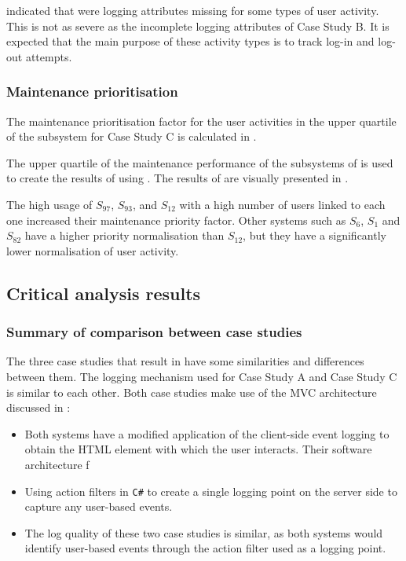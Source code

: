 indicated that were logging attributes missing for some types of user activity. This is not as severe as the incomplete logging attributes of Case Study B. It is expected that the main purpose of these activity types is to track log-in and log-out attempts.

\subsubsection{Maintenance prioritisation}
The maintenance prioritisation factor for the user activities in the upper quartile of the subsystem for Case Study C is calculated in .

\clearpage



The upper quartile of the maintenance performance of the subsystems of  is used to create the results of  using . The results of  are visually presented in .\par The high usage of $S_{97}$, $S_{93}$, and $S_{12}$ with a high number of users linked to each one increased their maintenance priority factor. Other systems such as $S_{6}$, $S_{1}$ and $S_{82}$ have a higher priority normalisation than $S_{12}$, but they have a significantly lower normalisation of user activity.

\clearpage

\subsection{Critical analysis results}\label{sec:ch3_criticalAnalysis}

\subsubsection{Summary of comparison between case studies}
The three case studies that result in  have some similarities and differences between them. The logging mechanism used for Case Study A and Case Study C is similar to each other. Both case studies make use of the MVC architecture discussed in :

\begin{itemize}
	\item Both systems have a modified application of the  client-side event logging to obtain the HTML element with which the user interacts. Their software architecture f
	\item Using action filters in \texttt{C\#} to create a single logging point on the server side to capture any user-based events. 
	\item The log quality of these two case studies is similar, as both systems would identify user-based events through the action filter used as a logging point.
\end{itemize}

